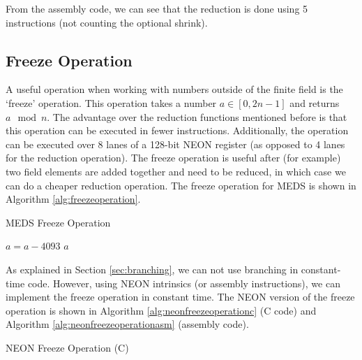 \documentclass[11pt,a4paper]{report}
\theoremstyle{definition}
\begin{document}
From the assembly code, we can see that the reduction is done using 5 instructions (not counting the optional shrink).

\subsection{Freeze Operation}
A useful operation when working with numbers outside of the finite field is the `freeze' operation. This operation takes a number $a \in [0, 2n-1]$ and returns $a \mod n$. The advantage over the reduction functions mentioned before is that this operation can be executed in fewer instructions. Additionally, the operation can be executed over 8 lanes of a 128-bit NEON register (as opposed to 4 lanes for the reduction operation). The freeze operation is useful after (for example) two field elements are added together and need to be reduced, in which case we can do a cheaper reduction operation. The freeze operation for MEDS is shown in Algorithm \ref{alg:freezeoperation}.

\begin{algorithm}
  \caption{MEDS Freeze Operation}
  \label{alg:freezeoperation}
  \begin{algorithmic}
        \State $a = a - 4093$
      \EndIf
      \State \Return $a$
    \EndFunction
  \end{algorithmic}
\end{algorithm}

As explained in Section \ref{sec:branching}, we can not use branching in constant-time code. However, using NEON intrinsics (or assembly instructions), we can implement the freeze operation in constant time. The NEON version of the freeze operation is shown in Algorithm \ref{alg:neonfreezeoperationc} (C code) and Algorithm \ref{alg:neonfreezeoperationasm} (assembly code).

\begin{algorithm}
  \caption{NEON Freeze Operation (C)}
  \label{alg:neonfreezeoperationc}
  
\end{algorithm}

\begin{algorithm}
  \caption{NEON Freeze Operation (Assembly)}
  \label{alg:neonfreezeoperationasm}
  Assembler}, style=ASMStyle]{code/freeze_asm.s}
\end{algorithm}
\end{document}
